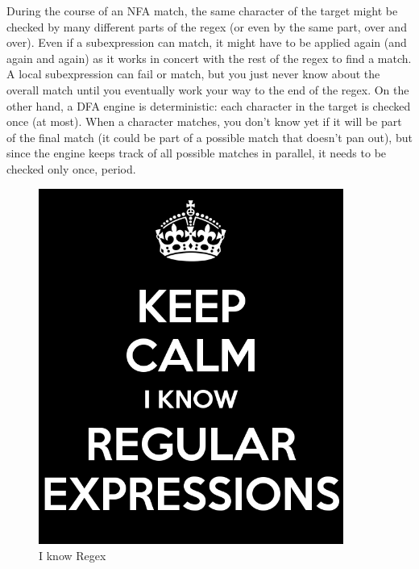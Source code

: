 During the course of an NFA match, the same character of the target 
might be checked by many different parts of the regex (or even by the same part, 
over and over). Even if a subexpression can match, it might have to be applied again 
(and again and again) as it works in concert with the rest of the regex to find a match. 
A local subexpression can fail or match, but you just never know about the overall match 
until you eventually work your way to the end of the regex. On the other hand, a DFA 
engine is deterministic: each character in the target is checked once (at most). When a 
character matches, you don't know yet if it will be part of the final match (it could be 
part of a possible match that doesn't pan out), but since the engine keeps track of all 
possible matches in parallel, it needs to be checked only once, period.

\begin{figure}[h]
	\centering
	\includegraphics[width=100mm]{img/regex.png}
	\caption{I know Regex}
\end{figure}